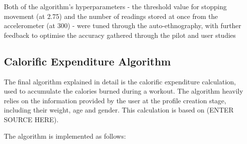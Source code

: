 \documentclass{l4proj}
\begin{document}
Both of the algorithm’s hyperparameters - the threshold value for stopping movement (at 2.75) and the number of readings stored at once from the accelerometer (at 300) - were tuned through the auto-ethnography, with further feedback to optimise the accuracy gathered through the pilot and user studies

\subsection{Calorific Expenditure Algorithm}
\label{sec:calories}

The final algorithm explained in detail is the calorific expenditure calculation, used to accumulate the calories burned during a workout. The algorithm heavily relies on the information provided by the user at the profile creation stage, including their weight, age and gender. This calculation is based on (ENTER SOURCE HERE).

The algorithm is implemented as follows:
\end{document}

